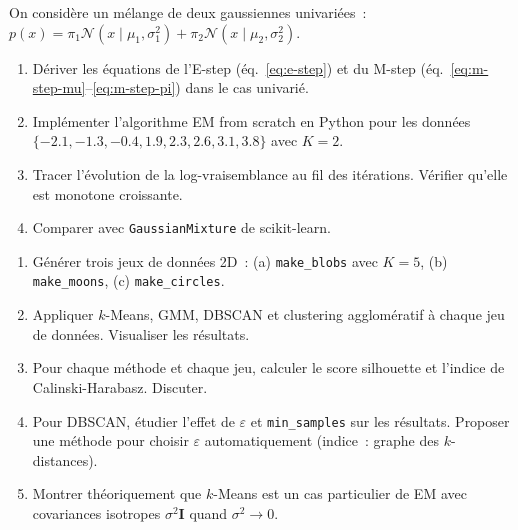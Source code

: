 \begin{exercice}
On consid\`ere un m\'elange de deux gaussiennes univari\'ees~:
$p(x) = \pi_1 \mathcal{N}(x \mid \mu_1, \sigma_1^2) + \pi_2
\mathcal{N}(x \mid \mu_2, \sigma_2^2)$.
\begin{enumerate}
  \item D\'eriver les \'equations de l'E-step (\'eq.~\eqref{eq:e-step}) et du
    M-step (\'eq.~\eqref{eq:m-step-mu}--\eqref{eq:m-step-pi}) dans le cas
    univari\'e.
  \item Impl\'ementer l'algorithme EM from scratch en Python pour les donn\'ees
    $\{-2.1, -1.3, -0.4, 1.9, 2.3, 2.6, 3.1, 3.8\}$ avec $K = 2$.
  \item Tracer l'\'evolution de la log-vraisemblance au fil des it\'erations.
    V\'erifier qu'elle est monotone croissante.
  \item Comparer avec \texttt{GaussianMixture} de scikit-learn.
\end{enumerate}
\end{exercice}

\begin{exercice}
\begin{enumerate}
  \item G\'en\'erer trois jeux de donn\'ees 2D~: (a) \texttt{make\_blobs}
    avec $K=5$, (b) \texttt{make\_moons}, (c) \texttt{make\_circles}.
  \item Appliquer $k$-Means, GMM, DBSCAN et clustering agglom\'eratif \`a
    chaque jeu de donn\'ees. Visualiser les r\'esultats.
  \item Pour chaque m\'ethode et chaque jeu, calculer le score silhouette et
    l'indice de Calinski-Harabasz. Discuter.
  \item Pour DBSCAN, \'etudier l'effet de $\varepsilon$ et \texttt{min\_samples}
    sur les r\'esultats. Proposer une m\'ethode pour choisir $\varepsilon$
    automatiquement (indice~: graphe des $k$-distances).
  \item Montrer th\'eoriquement que $k$-Means est un cas particulier de EM
    avec covariances isotropes $\sigma^2 \bm{I}$ quand $\sigma^2 \to 0$.
\end{enumerate}
\end{exercice}
